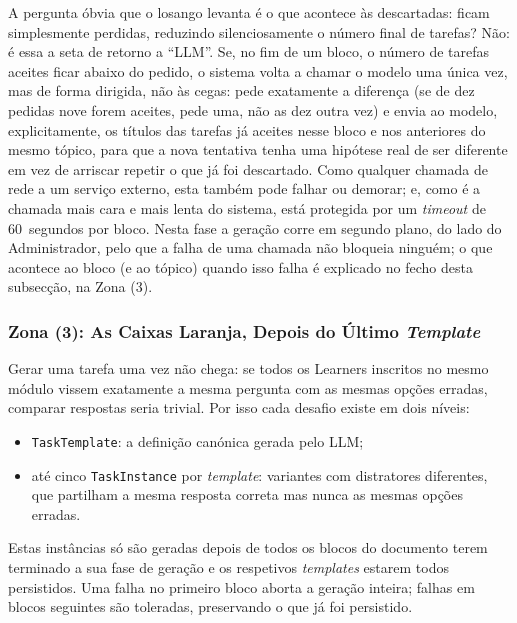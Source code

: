 A pergunta óbvia que o losango levanta é o que acontece às descartadas: ficam simplesmente perdidas, reduzindo silenciosamente o número final de tarefas? Não: é essa a seta de retorno a ``LLM''. Se, no fim de um bloco, o número de tarefas aceites ficar abaixo do pedido, o sistema volta a chamar o modelo uma única vez, mas de forma dirigida, não às cegas: pede exatamente a diferença (se de dez pedidas nove forem aceites, pede uma, não as dez outra vez) e envia ao modelo, explicitamente, os títulos das tarefas já aceites nesse bloco e nos anteriores do mesmo tópico, para que a nova tentativa tenha uma hipótese real de ser diferente em vez de arriscar repetir o que já foi descartado. Como qualquer chamada de rede a um serviço externo, esta também pode falhar ou demorar; e, como é a chamada mais cara e mais lenta do sistema, está protegida por um \textit{timeout} de 60~segundos por bloco. Nesta fase a geração corre em segundo plano, do lado do Administrador, pelo que a falha de uma chamada não bloqueia ninguém; o que acontece ao bloco (e ao tópico) quando isso falha é explicado no fecho desta subsecção, na Zona (3).

\subsubsection*{Zona (3): As Caixas Laranja, Depois do Último \textit{Template}}

Gerar uma tarefa uma vez não chega: se todos os Learners inscritos no mesmo módulo vissem exatamente a mesma pergunta com as mesmas opções erradas, comparar respostas seria trivial. Por isso cada desafio existe em dois níveis:

\begin{itemize}
    \item \texttt{TaskTemplate}: a definição canónica gerada pelo LLM;
    \item até cinco \texttt{TaskInstance} por \textit{template}: variantes com distratores diferentes, que partilham a mesma resposta correta mas nunca as mesmas opções erradas.
\end{itemize}

Estas instâncias só são geradas depois de todos os blocos do documento terem terminado a sua fase de geração e os respetivos \textit{templates} estarem todos persistidos. Uma falha no primeiro bloco aborta a geração inteira; falhas em blocos seguintes são toleradas, preservando o que já foi persistido.

